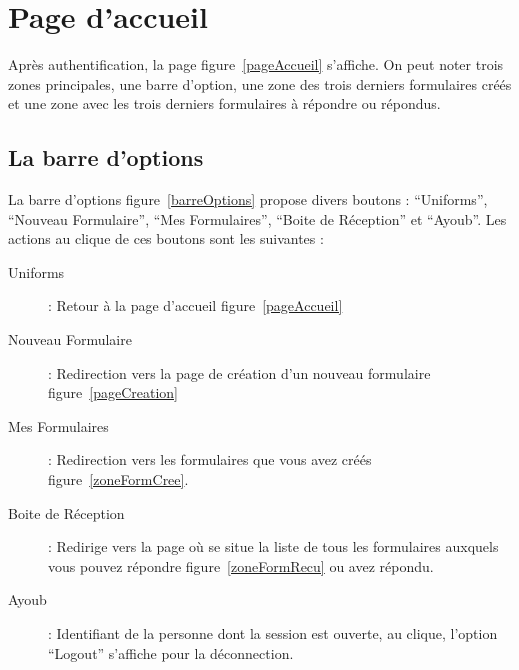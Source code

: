 \documentclass[a4paper,11pt,final]{report}
\begin{document}
\section{Page d'accueil}
Après authentification, la page figure~\ref{pageAccueil} s'affiche. On peut noter trois zones principales, une barre d'option, une zone des trois derniers formulaires créés et une zone avec les trois derniers formulaires à répondre ou répondus.\\
\noindent\begin{minipage}{\linewidth}%
\label{pageAccueil}
\end{minipage}

\subsection{La barre d'options}\label{sec:barreOption}
La barre d'options figure~\ref{barreOptions} propose divers boutons : ``Uniforms'', ``Nouveau Formulaire'', ``Mes Formulaires'', ``Boite de Réception'' et ``Ayoub''. Les actions au clique de ces boutons sont les suivantes :
\begin{description}
	\item [Uniforms] : Retour à la page d'accueil figure~\ref{pageAccueil}
	\item [Nouveau Formulaire] : Redirection vers la page de création d'un nouveau formulaire figure~\ref{pageCreation}
	\item [Mes Formulaires] : Redirection vers les formulaires que vous avez créés figure~\ref{zoneFormCree}.
	\item [Boite de Réception] : Redirige vers la page où se situe la liste de tous les formulaires auxquels vous pouvez répondre figure~\ref{zoneFormRecu} ou avez répondu.
	\item [Ayoub] : Identifiant de la personne dont la session est ouverte, au clique, l'option ``Logout'' s'affiche pour la déconnection.
\end{description}
\end{document}
